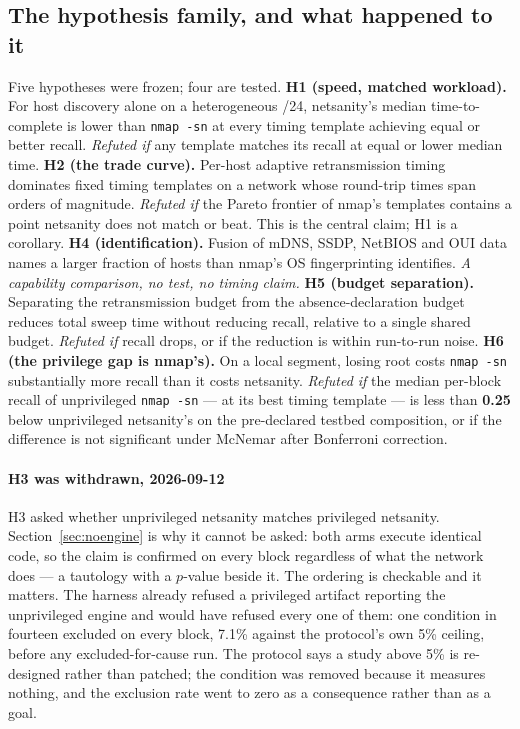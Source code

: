 \documentclass[conference]{IEEEtran}
\newcommand{\netsanity}{\textsf{netsanity}}
\newcommand{\nmapsn}{\texttt{nmap -sn}}
\begin{document}
\subsection{The hypothesis family, and what happened to it}
\label{sec:family}

Five hypotheses were frozen; four are tested.
\textbf{H1 (speed, matched workload).} For host discovery alone on a
heterogeneous /24, \netsanity{}'s median time-to-complete is lower than
\nmapsn{} at every timing template achieving equal or better recall.
\emph{Refuted if} any template matches its recall at equal or lower median
time.
\textbf{H2 (the trade curve).} Per-host adaptive retransmission timing
dominates fixed timing templates on a network whose round-trip times span
orders of magnitude. \emph{Refuted if} the Pareto frontier of nmap's templates
contains a point \netsanity{} does not match or beat. This is the central
claim; H1 is a corollary.
\textbf{H4 (identification).} Fusion of mDNS, SSDP, NetBIOS and OUI data names
a larger fraction of hosts than nmap's OS fingerprinting identifies.
\emph{A capability comparison, no test, no timing claim.}
\textbf{H5 (budget separation).} Separating the retransmission budget from the
absence-declaration budget reduces total sweep time without reducing recall,
relative to a single shared budget. \emph{Refuted if} recall drops, or if the
reduction is within run-to-run noise.
\textbf{H6 (the privilege gap is nmap's).} On a local segment, losing root
costs \nmapsn{} substantially more recall than it costs \netsanity{}.
\emph{Refuted if} the median per-block recall of unprivileged \nmapsn{} --- at
its best timing template --- is less than \textbf{0.25} below unprivileged
\netsanity{}'s on the pre-declared testbed composition, or if the difference is
not significant under McNemar after Bonferroni correction.

\paragraph*{H3 was withdrawn, 2026-09-12} H3 asked whether unprivileged
\netsanity{} matches privileged \netsanity{}. Section~\ref{sec:noengine} is why
it cannot be asked: both arms execute identical code, so the claim is confirmed
on every block regardless of what the network does --- a tautology with a
$p$-value beside it. The ordering is checkable and it matters. The harness
already refused a privileged artifact reporting the unprivileged engine and
would have refused every one of them: one condition in fourteen excluded on
every block, 7.1\% against the protocol's own 5\% ceiling, before any
excluded-for-cause run. The protocol says a study above 5\% is re-designed
rather than patched; the condition was removed because it measures nothing, and
the exclusion rate went to zero as a consequence rather than as a goal.
\end{document}
